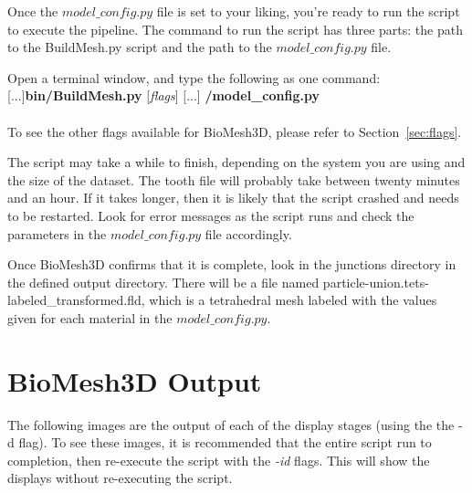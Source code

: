 \documentclass[fleqn,12pt,openany]{book}
\begin{document}
Once the $model\_config.py$ file is set to your liking, you're ready to run the 
script to execute the pipeline. The command to run the script has three parts: 
the path to the BuildMesh.py script and the path to the $model\_config.py$ file.  

Open a terminal window, and type the following as one command:\\

[...]{\bf bin/BuildMesh.py}  [{\it flags}] [...] {\bf /model\_config.py}\\ \\

To see the other flags available for BioMesh3D, please refer to Section~\ref{sec:flags}.

The script may take a while to finish, depending on the system you are using and 
the size of the dataset. The tooth file will probably take between twenty 
minutes and an hour. If it takes longer, then it is likely that the script 
crashed and needs to be restarted. Look for error messages as the script runs and 
check the parameters in the $model\_config.py$ file accordingly.  

Once BioMesh3D confirms that it is complete, look in the junctions directory 
in the defined output directory. There will be a file named particle-union.tets-labeled\_transformed.fld, which is a tetrahedral mesh labeled with the values given for each material in the $model\_config.py$.


\section{BioMesh3D Output}
\label{sec:output}

The following images are the output of each of the display stages (using the the -d flag). To see these images, it is recommended that the entire script run to completion, then re-execute the script with the \emph{-id} flags. This will show the displays without re-executing the script.
\end{document}
